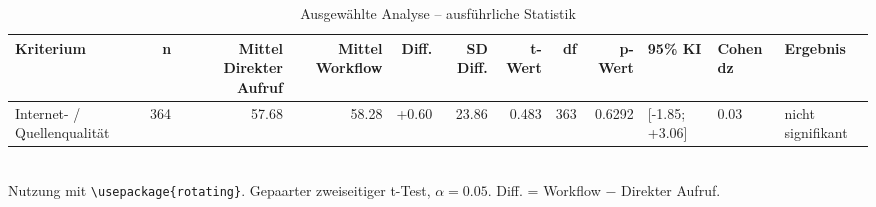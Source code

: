 \begin{table}
\centering
\caption{Ausgewählte Analyse -- ausführliche Statistik}
\begin{tabular}{lrrrrrrrrlll}
\toprule
Kriterium & n & Mittel Direkter Aufruf & Mittel Workflow & Diff. & SD Diff. & t-Wert & df & p-Wert & 95\% KI & Cohen dz & Ergebnis \\
\midrule
Internet- / Quellenqualität & 364 & 57.68 & 58.28 & +0.60 & 23.86 & 0.483 & 363 & 0.6292 & [-1.85; +3.06] & 0.03 & nicht signifikant \\
\bottomrule
\end{tabular}
\\[2mm]
\footnotesize Nutzung mit \texttt{\textbackslash usepackage\{rotating\}}. Gepaarter zweiseitiger t-Test, $\alpha=0.05$. Diff. = Workflow $-$ Direkter Aufruf.
\end{table}
